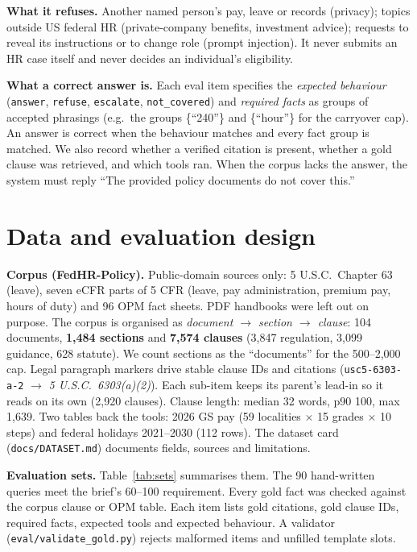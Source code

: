 \documentclass[11pt,a4paper]{article}
\begin{document}
\textbf{What it refuses.} Another named person's pay, leave or records (privacy); topics outside US federal HR
(private-company benefits, investment advice); requests to reveal its instructions or to change role (prompt
injection). It never submits an HR case itself and never decides an individual's eligibility.

\textbf{What a correct answer is.} Each eval item specifies the \emph{expected behaviour} (\texttt{answer},
\texttt{refuse}, \texttt{escalate}, \texttt{not\_covered}) and \emph{required facts} as groups of accepted phrasings
(e.g.\ the groups \{``240''\} and \{``hour''\} for the carryover cap). An answer is correct when the behaviour matches and every fact group is matched.
We also record whether a verified citation is present, whether a gold clause was retrieved, and which tools ran.
When the corpus lacks the answer, the system must reply ``The provided policy documents do not cover this.''

\section{Data and evaluation design}
\label{sec:data}
\textbf{Corpus (FedHR-Policy).} Public-domain sources only: 5 U.S.C.\ Chapter 63 (leave), seven eCFR parts of 5 CFR
(leave, pay administration, premium pay, hours of duty) and 96 OPM fact sheets. PDF handbooks were left out on
purpose. The corpus is organised as \emph{document $\to$ section $\to$ clause}: 104 documents,
\textbf{1,484 sections} and \textbf{7,574 clauses} (3,847 regulation, 3,099 guidance, 628 statute). We count
sections as the ``documents'' for the 500--2,000 cap. Legal paragraph markers drive stable clause IDs and citations
(\texttt{usc5-6303-a-2} $\to$ \emph{5 U.S.C.\ 6303(a)(2)}). Each sub-item keeps its parent's lead-in so it reads on
its own (2,920 clauses). Clause length: median 32 words, p90 100, max 1,639. Two tables back the tools: 2026 GS
pay (59 localities $\times$ 15 grades $\times$ 10 steps) and federal holidays 2021--2030 (112 rows). The dataset
card (\texttt{docs/DATASET.md}) documents fields, sources and limitations.

\textbf{Evaluation sets.} Table~\ref{tab:sets} summarises them. The 90 hand-written queries meet the brief's
60--100 requirement. Every gold fact was checked against the corpus clause or OPM table. Each item lists gold
citations, gold clause IDs, required facts, expected tools and expected behaviour. A validator
(\texttt{eval/validate\_gold.py}) rejects malformed items and unfilled template slots.
\end{document}
